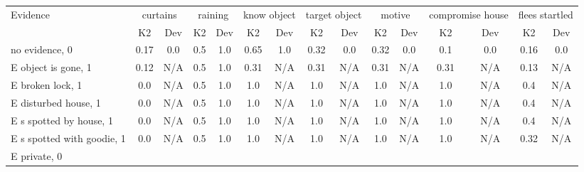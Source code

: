 \begin{table}\begin{tabular}{l|cc|cc|cc|cc|cc|cc|cc}\toprule\multirow{2}{*}{Evidence} & \multicolumn{2}{c}{curtains}& \multicolumn{2}{c}{raining}& \multicolumn{2}{c}{know object}& \multicolumn{2}{c}{target object}& \multicolumn{2}{c}{motive}& \multicolumn{2}{c}{compromise house}& \multicolumn{2}{c}{flees startled}\\& {K2} & {Dev}& {K2} & {Dev}& {K2} & {Dev}& {K2} & {Dev}& {K2} & {Dev}& {K2} & {Dev}& {K2} & {Dev}\\\midrule
no evidence, 0 & \cellcolor{Bittersweet}0.17&\cellcolor{Bittersweet}0.0&\cellcolor{Bittersweet}0.5&\cellcolor{Bittersweet}1.0&\cellcolor{Bittersweet}0.65&\cellcolor{Bittersweet}1.0&\cellcolor{Bittersweet}0.32&\cellcolor{Bittersweet}0.0&\cellcolor{Bittersweet}0.32&\cellcolor{Bittersweet}0.0&\cellcolor{Bittersweet}0.1&\cellcolor{Bittersweet}0.0&\cellcolor{Bittersweet}0.16&\cellcolor{Bittersweet}0.0\\E object is gone, 1 & \cellcolor{Bittersweet}0.12&\cellcolor{Bittersweet}N/A&\cellcolor{Bittersweet}0.5&\cellcolor{Bittersweet}1.0&\cellcolor{Bittersweet}0.31&\cellcolor{Bittersweet}N/A&\cellcolor{Bittersweet}0.31&\cellcolor{Bittersweet}N/A&\cellcolor{Bittersweet}0.31&\cellcolor{Bittersweet}N/A&\cellcolor{Bittersweet}0.31&\cellcolor{Bittersweet}N/A&\cellcolor{Bittersweet}0.13&\cellcolor{Bittersweet}N/A\\E broken lock, 1 & \cellcolor{Bittersweet}0.0&\cellcolor{Bittersweet}N/A&\cellcolor{Bittersweet}0.5&\cellcolor{Bittersweet}1.0&\cellcolor{Bittersweet}1.0&\cellcolor{Bittersweet}N/A&\cellcolor{Bittersweet}1.0&\cellcolor{Bittersweet}N/A&\cellcolor{Bittersweet}1.0&\cellcolor{Bittersweet}N/A&\cellcolor{Bittersweet}1.0&\cellcolor{Bittersweet}N/A&\cellcolor{Bittersweet}0.4&\cellcolor{Bittersweet}N/A\\E disturbed house, 1 & \cellcolor{Bittersweet}0.0&\cellcolor{Bittersweet}N/A&\cellcolor{Bittersweet}0.5&\cellcolor{Bittersweet}1.0&\cellcolor{Bittersweet}1.0&\cellcolor{Bittersweet}N/A&\cellcolor{Bittersweet}1.0&\cellcolor{Bittersweet}N/A&\cellcolor{Bittersweet}1.0&\cellcolor{Bittersweet}N/A&\cellcolor{Bittersweet}1.0&\cellcolor{Bittersweet}N/A&\cellcolor{Bittersweet}0.4&\cellcolor{Bittersweet}N/A\\E s spotted by house, 1 & \cellcolor{Bittersweet}0.0&\cellcolor{Bittersweet}N/A&\cellcolor{Bittersweet}0.5&\cellcolor{Bittersweet}1.0&\cellcolor{Bittersweet}1.0&\cellcolor{Bittersweet}N/A&\cellcolor{Bittersweet}1.0&\cellcolor{Bittersweet}N/A&\cellcolor{Bittersweet}1.0&\cellcolor{Bittersweet}N/A&\cellcolor{Bittersweet}1.0&\cellcolor{Bittersweet}N/A&\cellcolor{Bittersweet}0.4&\cellcolor{Bittersweet}N/A\\E s spotted with goodie, 1 & \cellcolor{Bittersweet}0.0&\cellcolor{Bittersweet}N/A&\cellcolor{Bittersweet}0.5&\cellcolor{Bittersweet}1.0&\cellcolor{Bittersweet}1.0&\cellcolor{Bittersweet}N/A&\cellcolor{Bittersweet}1.0&\cellcolor{Bittersweet}N/A&\cellcolor{Bittersweet}1.0&\cellcolor{Bittersweet}N/A&\cellcolor{Bittersweet}1.0&\cellcolor{Bittersweet}N/A&\cellcolor{Bittersweet}0.32&\cellcolor{Bittersweet}N/A\\E private, 0 & 
\end{tabular}
\end{table}
